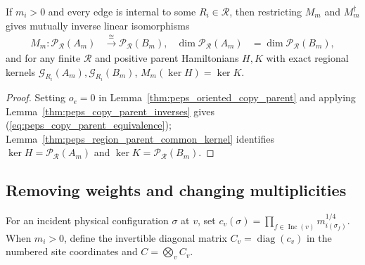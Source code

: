 \begin{lemma}%
    \label{thm:peps_copy_parent_equivalence}
    \leanok
    If $m_i>0$ and every edge is internal to some $R_i\in\mathcal R$, then restricting $M_m$ and $M_m^\dagger$ gives mutually inverse linear isomorphisms
    \begin{align}
        M_m:\mathcal P_{\mathcal R}(A_m)
         & \xrightarrow{\ \cong\ }\mathcal P_{\mathcal R}(B_m),
         & \dim\mathcal P_{\mathcal R}(A_m)                     & =
        \dim\mathcal P_{\mathcal R}(B_m),
        \label{eq:peps_copy_parent_equivalence}
    \end{align}
    and for any finite $\mathcal R$ and positive parent Hamiltonians $H,K$ with exact regional kernels $\mathcal G_{R_i}(A_m),\mathcal G_{R_i}(B_m)$, $M_m(\ker H)=\ker K$.
\end{lemma}
\begin{proof}\leanok
    Setting $o_e=0$ in Lemma~\ref{thm:peps_oriented_copy_parent} and applying Lemma~\ref{thm:peps_copy_parent_inverses} gives (\ref{eq:peps_copy_parent_equivalence}); Lemma~\ref{thm:peps_region_parent_common_kernel} identifies $\ker H=\mathcal P_{\mathcal R}(A_m)$ and $\ker K=\mathcal P_{\mathcal R}(B_m)$.
\end{proof}

\subsection{Removing weights and changing multiplicities}

\begin{definition}%
    \label{def:peps_copy_physical_filter}
    \leanok
    For an incident physical configuration $\sigma$ at $v$, set
    $c_v(\sigma)=\prod_{f\in\operatorname{Inc}(v)}m_{i(\sigma_f)}^{1/4}$.
    When $m_i>0$, define the invertible diagonal matrix $C_v=\operatorname{diag}(c_v)$ in the numbered site coordinates and $C=\bigotimes_vC_v$.
\end{definition}

